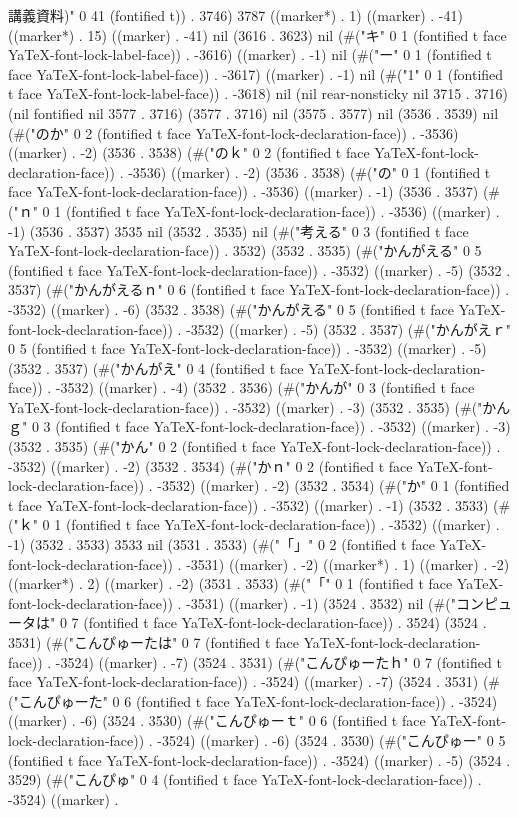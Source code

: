 {	講義資料)" 0 41 (fontified t)) . 3746) 3787 ((marker*) . 1) ((marker) . -41) ((marker*) . 15) ((marker) . -41) nil (3616 . 3623) nil (#("キ" 0 1 (fontified t face YaTeX-font-lock-label-face)) . -3616) ((marker) . -1) nil (#("ー" 0 1 (fontified t face YaTeX-font-lock-label-face)) . -3617) ((marker) . -1) nil (#("1" 0 1 (fontified t face YaTeX-font-lock-label-face)) . -3618) nil (nil rear-nonsticky nil 3715 . 3716) (nil fontified nil 3577 . 3716) (3577 . 3716) nil (3575 . 3577) nil (3536 . 3539) nil (#("のか" 0 2 (fontified t face YaTeX-font-lock-declaration-face)) . -3536) ((marker) . -2) (3536 . 3538) (#("のｋ" 0 2 (fontified t face YaTeX-font-lock-declaration-face)) . -3536) ((marker) . -2) (3536 . 3538) (#("の" 0 1 (fontified t face YaTeX-font-lock-declaration-face)) . -3536) ((marker) . -1) (3536 . 3537) (#("ｎ" 0 1 (fontified t face YaTeX-font-lock-declaration-face)) . -3536) ((marker) . -1) (3536 . 3537) 3535 nil (3532 . 3535) nil (#("考える" 0 3 (fontified t face YaTeX-font-lock-declaration-face)) . 3532) (3532 . 3535) (#("かんがえる" 0 5 (fontified t face YaTeX-font-lock-declaration-face)) . -3532) ((marker) . -5) (3532 . 3537) (#("かんがえるｎ" 0 6 (fontified t face YaTeX-font-lock-declaration-face)) . -3532) ((marker) . -6) (3532 . 3538) (#("かんがえる" 0 5 (fontified t face YaTeX-font-lock-declaration-face)) . -3532) ((marker) . -5) (3532 . 3537) (#("かんがえｒ" 0 5 (fontified t face YaTeX-font-lock-declaration-face)) . -3532) ((marker) . -5) (3532 . 3537) (#("かんがえ" 0 4 (fontified t face YaTeX-font-lock-declaration-face)) . -3532) ((marker) . -4) (3532 . 3536) (#("かんが" 0 3 (fontified t face YaTeX-font-lock-declaration-face)) . -3532) ((marker) . -3) (3532 . 3535) (#("かんｇ" 0 3 (fontified t face YaTeX-font-lock-declaration-face)) . -3532) ((marker) . -3) (3532 . 3535) (#("かん" 0 2 (fontified t face YaTeX-font-lock-declaration-face)) . -3532) ((marker) . -2) (3532 . 3534) (#("かｎ" 0 2 (fontified t face YaTeX-font-lock-declaration-face)) . -3532) ((marker) . -2) (3532 . 3534) (#("か" 0 1 (fontified t face YaTeX-font-lock-declaration-face)) . -3532) ((marker) . -1) (3532 . 3533) (#("ｋ" 0 1 (fontified t face YaTeX-font-lock-declaration-face)) . -3532) ((marker) . -1) (3532 . 3533) 3533 nil (3531 . 3533) (#("「」" 0 2 (fontified t face YaTeX-font-lock-declaration-face)) . -3531) ((marker) . -2) ((marker*) . 1) ((marker) . -2) ((marker*) . 2) ((marker) . -2) (3531 . 3533) (#("「" 0 1 (fontified t face YaTeX-font-lock-declaration-face)) . -3531) ((marker) . -1) (3524 . 3532) nil (#("コンピュータは" 0 7 (fontified t face YaTeX-font-lock-declaration-face)) . 3524) (3524 . 3531) (#("こんぴゅーたは" 0 7 (fontified t face YaTeX-font-lock-declaration-face)) . -3524) ((marker) . -7) (3524 . 3531) (#("こんぴゅーたｈ" 0 7 (fontified t face YaTeX-font-lock-declaration-face)) . -3524) ((marker) . -7) (3524 . 3531) (#("こんぴゅーた" 0 6 (fontified t face YaTeX-font-lock-declaration-face)) . -3524) ((marker) . -6) (3524 . 3530) (#("こんぴゅーｔ" 0 6 (fontified t face YaTeX-font-lock-declaration-face)) . -3524) ((marker) . -6) (3524 . 3530) (#("こんぴゅー" 0 5 (fontified t face YaTeX-font-lock-declaration-face)) . -3524) ((marker) . -5) (3524 . 3529) (#("こんぴゅ" 0 4 (fontified t face YaTeX-font-lock-declaration-face)) . -3524) ((marker) . }
